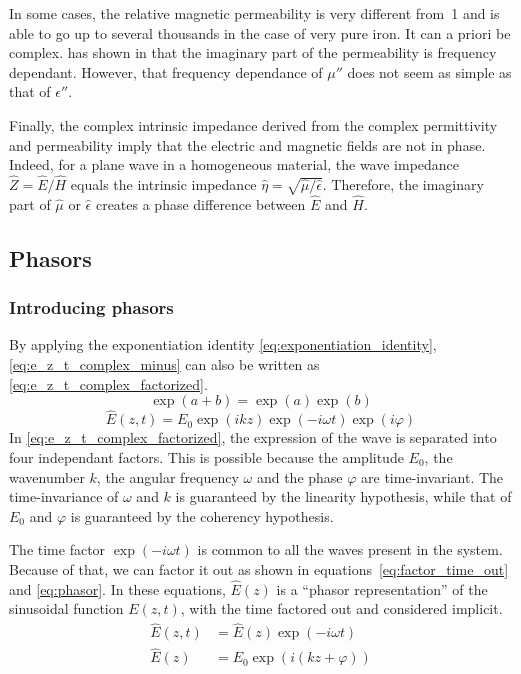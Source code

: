 In some cases, the relative magnetic permeability is very different from~1 and is able to go up to several thousands in the case of very pure iron.
It can a priori be complex.
\citeauthor{bowler2006frequency} has shown in  \cite{bowler2006frequency} that the imaginary part of the permeability is frequency dependant.
However, that frequency dependance of $\mu''$ does not seem as simple as that of $\epsilon''$.

Finally, the complex intrinsic impedance derived from the complex permittivity and permeability imply that the electric and magnetic fields are not in phase.
Indeed, for a plane wave in a homogeneous material, the wave impedance $\hat{Z}=\hat{E}/\hat{H}$ equals the intrinsic impedance $\hat{\eta}=\sqrt{\hat{\mu}/\hat{\epsilon}}$.
Therefore, the imaginary part of $\hat{\mu}$ or $\hat{\epsilon}$ creates a phase difference between $\hat{E}$ and $\hat{H}$.

\subsection{Phasors}

\subsubsection{Introducing phasors}
By applying the exponentiation identity \cref{eq:exponentiation_identity},
\cref{eq:e_z_t_complex_minus} can also be written as \cref{eq:e_z_t_complex_factorized}.
\begin{equation}
    \exp(a+b) = \exp(a) \exp(b)
    \label{eq:exponentiation_identity}
\end{equation}
\begin{equation}
    \hat{E}(z, t)
    =
    E_0 \exp(ikz) \exp(-i\omega t) \exp({i \varphi})
    \label{eq:e_z_t_complex_factorized}
\end{equation}
In \cref{eq:e_z_t_complex_factorized}, the expression of the wave is separated into four independant factors.
This is possible because the amplitude $E_0$, the wavenumber $k$, the angular frequency $\omega$ and the phase $\varphi$ are time-invariant.
The time-invariance of $\omega$ and $k$ is guaranteed by the linearity hypothesis, while that of $E_0$ and $\varphi$ is guaranteed by the coherency hypothesis.

The time factor $\exp({-i \omega t})$ is common to all the waves present in the system.
Because of that, we can factor it out as shown in equations~\ref{eq:factor_time_out} and \ref{eq:phasor}.
In these equations, $\hat{E}(z)$ is a ``phasor representation'' of the sinusoidal function $E(z, t)$, with the time factored out and considered implicit.
\begin{align}
    \hat{E}(z, t) &= \hat{E}(z) \exp(-i\omega t) \label{eq:factor_time_out}
    \\
    \hat{E}(z) &= E_0 \exp(i(kz+\varphi)) \label{eq:phasor}
\end{align}

